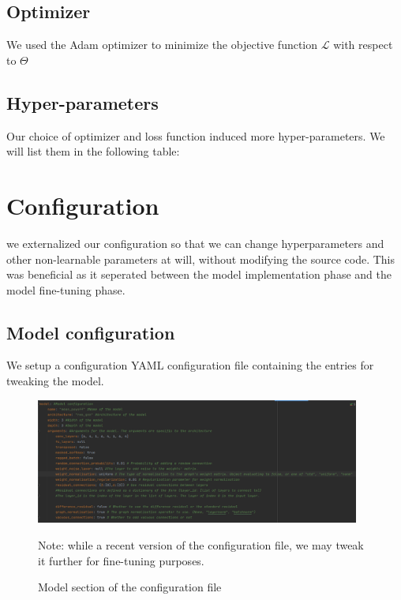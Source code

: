 \subsection{Optimizer}
We used the Adam optimizer \cite{AdamOptimizer} to minimize the objective function $\mathcal{L}$ with respect to $\Theta$

\subsection{Hyper-parameters}
Our choice of optimizer and loss function induced more hyper-parameters. We will list them in the following table:


\section{Configuration}
we externalized our configuration so that we can change hyperparameters and other non-learnable parameters at will, without modifying the source code. This was beneficial as it seperated between the model implementation phase and the model fine-tuning phase.
\subsection{Model configuration}
We setup a configuration YAML configuration file containing the entries for tweaking the model.
\begin{figure}[H]
	\centering
	\includegraphics[width=0.95\textwidth]{Figures/ModelConfiguration.png}
	\caption{Model section of the configuration file}
	\small{Note: while a recent version of the configuration file, we may tweak it further for fine-tuning purposes.}
\end{figure}
\FloatBarrier
